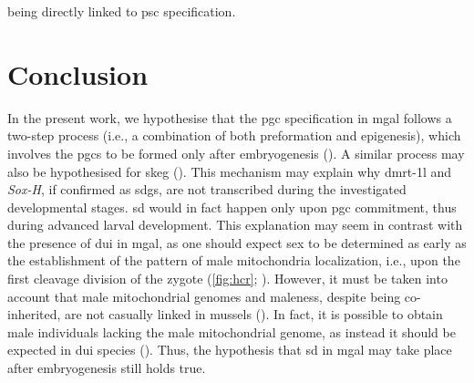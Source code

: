 being directly linked to \gls{psc} specification.

\section{Conclusion}\label{chapter:insitu-conclusions}
In the present work, we hypothesise that the \gls{pgc} specification in \gls{mgal} follows a two-step process (i.e., a combination of both preformation and epigenesis), which involves the \glspl{pgc} to be formed only after embryogenesis (). A similar process may also be hypothesised for \gls{skeg} (). This mechanism may explain why \gls{dmrt-1l} and \textit{Sox-H}, if confirmed as \glspl{sdg}, are not transcribed during the investigated developmental stages. \gls{sd} would in fact happen only upon \gls{pgc} commitment, thus during advanced larval development. This explanation may seem in contrast with the presence of \gls{dui} in \gls{mgal}, as one should expect sex to be determined as early as the establishment of the pattern of male mitochondria localization, i.e., upon the first cleavage division of the zygote (\cref{fig:hcr}; ). However, it must be taken into account that male mitochondrial genomes and maleness, despite being co-inherited, are not casually linked in mussels (). In fact, it is possible to obtain male individuals lacking the male mitochondrial genome, as instead it should be expected in \gls{dui} species (). Thus, the hypothesis that \gls{sd} in \gls{mgal} may take place after embryogenesis still holds true.

